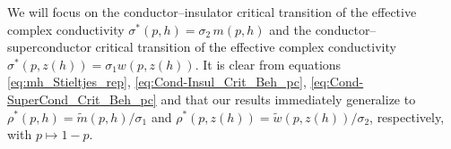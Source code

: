 \documentclass[english,12pt,jmp,graphicx]{revtex4-1}
\begin{document}

We will focus on the conductor--insulator critical transition of the
effective complex conductivity $\sigma^*(p,h)=\sigma_2\,m(p,h)$ and the
conductor--superconductor critical transition of the effective
complex conductivity $\sigma^*(p,z(h))=\sigma_1w(p,z(h))$. It is clear from equations
\eqref{eq:mh_Stieltjes_rep}, \eqref{eq:Cond-Insul_Crit_Beh_pc},
\eqref{eq:Cond-SuperCond_Crit_Beh_pc} and
that our results immediately generalize to
$\rho^*(p,h)=\tilde{m}(p,h)/\sigma_1$ and
$\rho^*(p,z(h))=\tilde{w}(p,z(h))/\sigma_2$, respectively, with
$p\mapsto1-p$.
\end{document}
